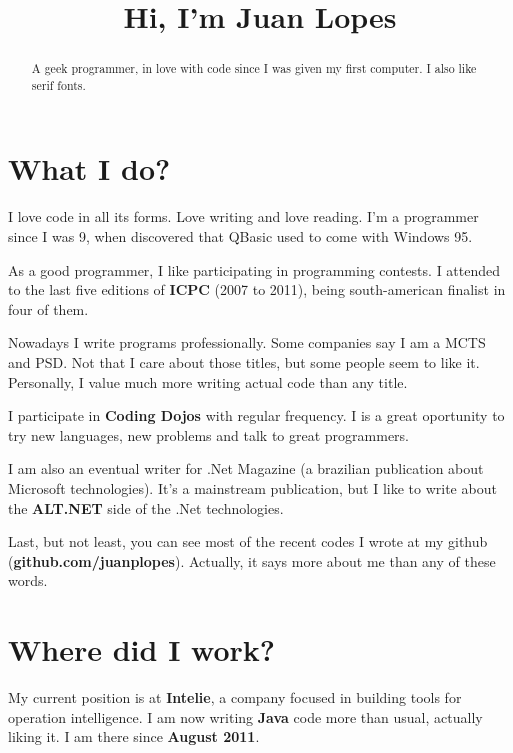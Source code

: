 \documentclass[a4paper,12pt,notitlepage]{article}
\begin{document}
\title{Hi, I'm Juan Lopes}
\renewcommand{\abstractname}{}

\maketitle

\begin{abstract}
\begin{center}
A geek programmer, in love with code since I was given my first computer.
I also like serif fonts.
\end{center}
\end{abstract}


\section{What I do?}

	I love code in all its forms. Love writing and love reading. I'm a programmer since I was 9, when discovered that QBasic used to come with Windows 95. 
	
	As a good programmer, I like participating in programming contests. I attended to the last five editions of \textbf{ICPC} (2007 to 2011), being south-american finalist in four of them.
	
	Nowadays I write programs professionally. Some companies say I am a MCTS and PSD. Not that I care about those titles, but some people seem to like it. Personally, I value much more writing actual code than any title.
	
	I participate in \textbf{Coding Dojos} with regular frequency. I is a great oportunity to try new languages, new problems and talk to great programmers.
	
	I am also an eventual writer for .Net Magazine (a brazilian publication about Microsoft technologies). It’s a mainstream publication, but I like to write about the \textbf{ALT.NET} side of the .Net technologies.
	
	Last, but not least, you can see most of the recent codes I wrote at my github (\textbf{github.com/juanplopes}). Actually, it says more about me than any of these words.
	
\section{Where did I work?}

	My current position is at \textbf{Intelie}, a company focused in building tools for operation intelligence. I am now writing \textbf{Java} code more than usual, actually liking it. I am there since \textbf{August 2011}.
	
\end{document}
